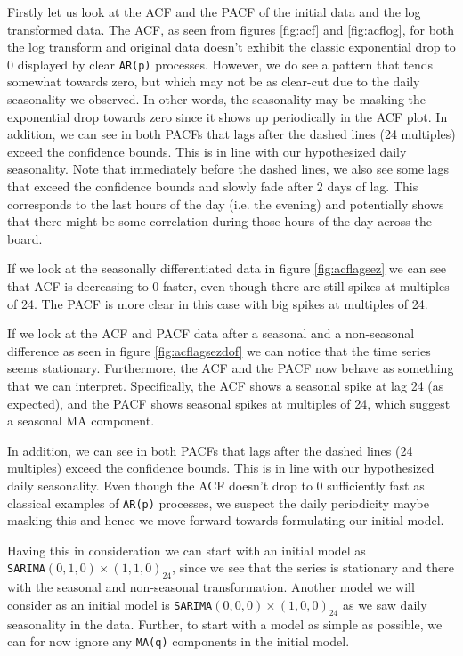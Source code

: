 \documentclass{article}
\begin{document}
Firstly let us look at the ACF and the PACF of the initial data and the log transformed data. The ACF, as seen from figures \ref{fig:acf} and \ref{fig:acflog}, for both the log transform and original data doesn’t exhibit the classic exponential drop to 0 displayed by clear \verb|AR(p)| processes. However, we do see a pattern that tends somewhat towards zero, but which may not be as clear-cut due to the daily seasonality we observed. In other words, the seasonality may be masking the exponential drop towards zero since
it shows up periodically in the ACF plot. 
In addition, we can see in both
PACFs that lags after the dashed lines (24 multiples) exceed the confidence bounds. This is in line
with our hypothesized daily seasonality. Note that immediately before the dashed lines, we also see
some lags that exceed the confidence bounds and slowly fade after 2 days of lag. This corresponds to the
last hours of the day (i.e. the evening) and potentially shows that there might be some correlation during those hours of the day across the board. 

If we look at the seasonally differentiated data in figure \ref{fig:acflagsez} we can see that ACF is decreasing to 0
faster, even though there are still spikes at multiples of 24. The PACF is more clear in this case with big spikes at multiples of 24.

If we look at the ACF and PACF data after a seasonal and a non-seasonal difference as seen in figure \ref{fig:acflagsezdof} we can notice that the time series seems stationary. Furthermore, the ACF and the PACF now behave as something that we can interpret. Specifically, the ACF shows a seasonal spike at lag 24 (as expected), and the PACF shows seasonal spikes at multiples of 24, which suggest a seasonal MA component.

In addition, we can see in both PACFs that lags after the dashed lines (24 multiples) exceed the confidence bounds. This is in line with our hypothesized daily seasonality. Even though the ACF doesn’t drop to 0 sufficiently fast as classical examples of \verb|AR(p)| processes, we suspect the daily periodicity maybe masking this and hence we move forward towards formulating our initial model.

Having this in consideration we can start with an initial model as \\
\verb|SARIMA|$(0,1,0) \times (1,1,0)_{24}$, since we see that the series is stationary and there with the seasonal and non-seasonal transformation. Another model we will consider as an initial model is \verb|SARIMA|$(0,0,0) \times (1,0,0)_{24}$ as we saw daily seasonality in the data. Further, to start with a model as simple as
possible, we can for now ignore any \verb|MA(q)| components in the initial model. 
\end{document}
